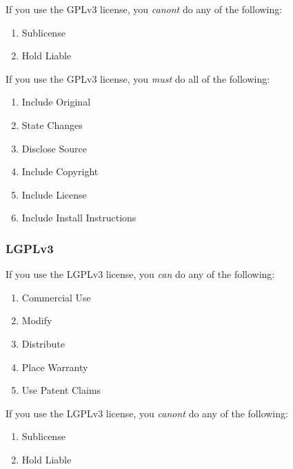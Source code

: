 \begin{flushleft}
	If you use the GPLv3 license, you \emph{canont} do any of the following:
\end{flushleft}

\begin{enumerate}
	\item Sublicense
	\item Hold Liable
\end{enumerate}

\begin{flushleft}
	If you use the GPLv3 license, you \emph{must} do all of the following:
\end{flushleft}

\begin{enumerate}
	\item Include Original
	\item State Changes
	\item Disclose Source
	\item Include Copyright
	\item Include License
	\item Include Install Instructions
\end{enumerate}


\subsubsection{LGPLv3}

\begin{flushleft}
	If you use the LGPLv3 license, you \emph{can} do any of the following:
\end{flushleft}

\begin{enumerate}
	\item Commercial Use
	\item Modify
	\item Distribute
	\item Place Warranty
	\item Use Patent Claims
\end{enumerate}

\begin{flushleft}
	If you use the LGPLv3 license, you \emph{canont} do any of the following:
\end{flushleft}

\begin{enumerate}
	\item Sublicense
	\item Hold Liable
\end{enumerate}


